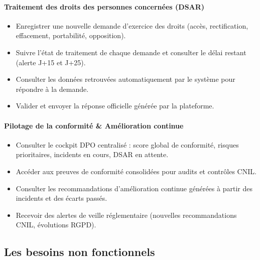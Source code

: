 \documentclass[12pt,a4paper]{report}
\begin{document}
\paragraph{Traitement des droits des personnes concernées (DSAR)}
\begin{itemize}[leftmargin=*, label=\textbullet]
    \item Enregistrer une nouvelle demande d'exercice des droits (accès, rectification, effacement, portabilité, opposition).
    \item Suivre l'état de traitement de chaque demande et consulter le délai restant (alerte J+15 et J+25).
    \item Consulter les données retrouvées automatiquement par le système pour répondre à la demande.
    \item Valider et envoyer la réponse officielle générée par la plateforme.
\end{itemize}

\paragraph{Pilotage de la conformité \& Amélioration continue}
\begin{itemize}[leftmargin=*, label=\textbullet]
    \item Consulter le cockpit DPO centralisé : score global de conformité, risques prioritaires, incidents en cours, DSAR en attente.
    \item Accéder aux preuves de conformité consolidées pour audits et contrôles CNIL.
    \item Consulter les recommandations d'amélioration continue générées à partir des incidents et des écarts passés.
    \item Recevoir des alertes de veille réglementaire (nouvelles recommandations CNIL, évolutions RGPD).
\end{itemize}

\subsection{Les besoins non fonctionnels}
\end{document}
